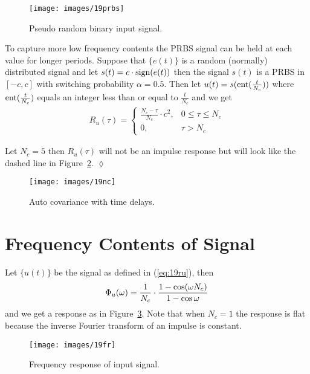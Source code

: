 \begin{figure}[ht!]
\centering
\texttt{[image: images/19prbs]}
\caption{Pseudo random binary input signal.}
\label{fig:19prbs}
\end{figure}

To capture more low frequency contents the PRBS signal can be held at each value for longer periods.
Suppose that $\{e(t)\}$ is a random (normally) distributed signal and let $s(t)=c\cdot\mathop{\text{sign}}\limits(e(t))$ then the signal $s(t)$ is a PRBS in $[-c,c]$ with switching probability $\alpha=0.5$.
Then let $u(t)=s(\mathop{\text{ent}}\limits(\frac{t}{N_c}))$ where $\mathop{\text{ent}}\limits(\frac{t}{N_c})$ equals an integer less than or equal to $\frac{t}{N_c}$ and we get
\begin{align}
\label{eq:19ru}
R_u(\tau) = \begin{cases} \frac{N_c-\tau}{N_c}\cdot c^2, & 0\leq\tau\leq N_c \\ 0, & \tau>N_c \end{cases}
\end{align}

\begin{example}
Let $N_c=5$ then $R_u(\tau)$ will not be an impulse response but will look like the dashed line in Figure~\ref{fig:19nc}.
$\lozenge$
\end{example}

\begin{figure}[ht!]
\centering
\texttt{[image: images/19nc]}
\caption{Auto covariance with time delays.}
\label{fig:19nc}
\end{figure}

\section{Frequency Contents of Signal}
Let $\{u(t)\}$ be the signal as defined in (\ref{eq:19ru}), then
$$\Phi_u(\omega) = \frac{1}{N_c}\cdot\frac{1-\cos(\omega N_c)}{1-\cos\omega}$$
and we get a response as in Figure~\ref{fig:19fr}.
Note that when $N_c=1$ the response is flat because the inverse Fourier transform of an impulse is constant.

\begin{figure}[ht!]
\centering
\texttt{[image: images/19fr]}
\caption{Frequency response of input signal.}
\label{fig:19fr}
\end{figure}

